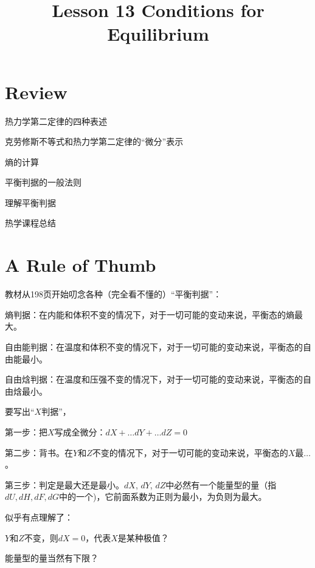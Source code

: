 \documentclass[CJK]{beamer}
\title{Lesson 13 Conditions for Equilibrium }
\author{}
\date{}
\begin{document}

\section{Review}

\begin{frame}
\bch 
\bitem
\item{热力学第二定律的四种表述}
\item{克劳修斯不等式和热力学第二定律的“微分”表示}
\item{熵的计算}
\eitem
\ech
\end{frame}

\begin{frame}
\bch
\bitem
\item{平衡判据的一般法则}
\item{理解平衡判据}
\item{热学课程总结}
\eitem
\ech
\end{frame}


\section{A Rule of Thumb}

\begin{frame}
\bch
教材从198页开始叨念各种（完全看不懂的）“平衡判据”：

\bitem
\item{熵判据：在内能和体积不变的情况下，对于一切可能的变动来说，平衡态的熵最大。}
\item{自由能判据：在温度和体积不变的情况下，对于一切可能的变动来说，平衡态的自由能最小。}
\item{自由焓判据：在温度和压强不变的情况下，对于一切可能的变动来说，平衡态的自由焓最小。}
\eitem

\ech
\end{frame}

\begin{frame}
\bch
{}

要写出“$X$判据”，

\bitem
\item{第一步：把$X$写成全微分：$dX + \ldots dY + \ldots dZ = 0$}
\item{第二步：背书。在$Y$和$Z$不变的情况下，对于一切可能的变动来说，平衡态的$X$最$\ldots$。}
\item{第三步：判定是最大还是最小。$dX$, $dY$, $dZ$中必然有一个能量型的量（指$dU, dH, dF, dG$中的一个)，它前面系数为正则为最小，为负则为最大。}
\eitem

{\scriptsize
似乎有点理解了：

$Y$和$Z$不变，则$dX = 0$，代表$X$是某种极值？

能量型的量当然有下限？
}
\ech
\end{frame}
\end{document}
